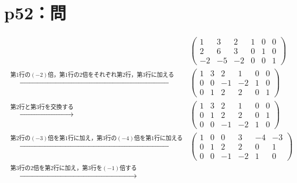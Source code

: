 \section*{p52：問}

\begin{tanswer}
  \begin{align*}
                                                                        &
    \left(
    \begin{array}{ccc|ccc}
        1  & 3  & 2  & 1 & 0 & 0 \\
        2  & 6  & 3  & 0 & 1 & 0 \\
        -2 & -5 & -2 & 0 & 0 & 1
      \end{array}
    \right)                                                               \\
    \xrightarrow{\text{第$1$行の$(-2)$倍，第$1$行の$2$倍をそれぞれ第$2$行，第$3$行に加える}}   &
    \left( \begin{array}{ccc|ccc}
               1 & 3 & 2  & 1  & 0 & 0 \\
               0 & 0 & -1 & -2 & 1 & 0 \\
               0 & 1 & 2  & 2  & 0 & 1
             \end{array}
    \right)                                                               \\
    \xrightarrow{\text{第$2$行と第$3$行を交換する}}                               &
    \left( \begin{array}{ccc|ccc}
               1 & 3 & 2  & 1  & 0 & 0 \\
               0 & 1 & 2  & 2  & 0 & 1 \\
               0 & 0 & -1 & -2 & 1 & 0
             \end{array}
    \right)                                                               \\
    \xrightarrow{\text{第$2$行の$(-3)$倍を第$1$行に加え，第$3$行の$(-4)$倍を第$1$行に加える}} &
    \left( \begin{array}{ccc|ccc}
               1 & 0 & 0  & 3  & -4 & -3 \\
               0 & 1 & 2  & 2  & 0  & 1  \\
               0 & 0 & -1 & -2 & 1  & 0
             \end{array}
    \right)                                                               \\
    \xrightarrow{\text{第$3$行の$2$倍を第$2$行に加え，第$3$行を$(-1)$倍する}}            &

\end{align*}
\end{tanswer}
